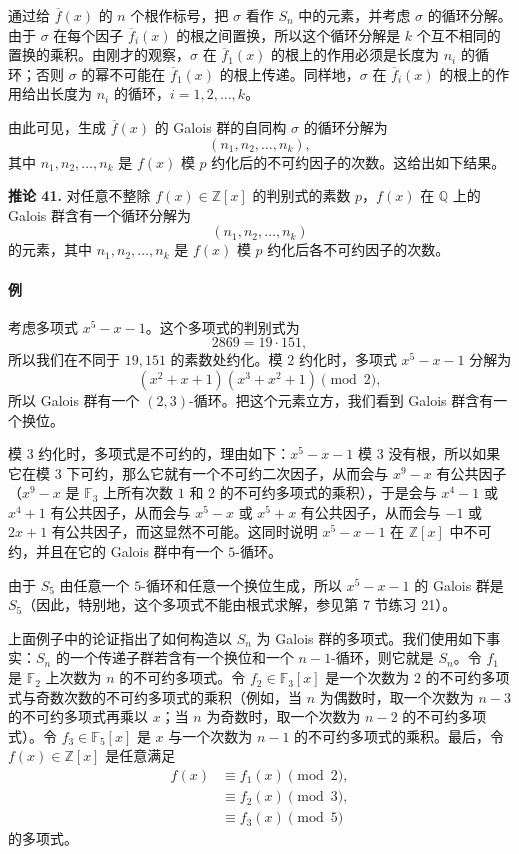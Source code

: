 通过给 $\overline f(x)$ 的 $n$ 个根作标号，把 $\sigma$ 看作 $S_n$ 中的元素，并考虑 $\sigma$ 的循环分解。由于 $\sigma$ 在每个因子 $\overline f_i(x)$ 的根之间置换，所以这个循环分解是 $k$ 个互不相同的置换的乘积。由刚才的观察，$\sigma$ 在 $\overline f_1(x)$ 的根上的作用必须是长度为 $n_i$ 的循环；否则 $\sigma$ 的幂不可能在 $\overline f_1(x)$ 的根上传递。同样地，$\sigma$ 在 $\overline f_i(x)$ 的根上的作用给出长度为 $n_i$ 的循环，$i=1,2,\ldots,k$。

由此可见，生成 $\overline f(x)$ 的 Galois 群的自同构 $\sigma$ 的循环分解为
\[
(n_1,n_2,\ldots,n_k),
\]
其中 $n_1,n_2,\ldots,n_k$ 是 $f(x)$ 模 $p$ 约化后的不可约因子的次数。这给出如下结果。

\noindent\textbf{推论 41.} 对任意不整除 $f(x)\in\mathbb Z[x]$ 的判别式的素数 $p$，$f(x)$ 在 $\mathbb Q$ 上的 Galois 群含有一个循环分解为
\[
(n_1,n_2,\ldots,n_k)
\]
的元素，其中 $n_1,n_2,\ldots,n_k$ 是 $f(x)$ 模 $p$ 约化后各不可约因子的次数。

\paragraph{例}
考虑多项式 $x^5-x-1$。这个多项式的判别式为
\[
2869=19\cdot151,
\]
所以我们在不同于 $19,151$ 的素数处约化。模 $2$ 约化时，多项式 $x^5-x-1$ 分解为
\[
(x^2+x+1)(x^3+x^2+1)\pmod 2,
\]
所以 Galois 群有一个 $(2,3)$-循环。把这个元素立方，我们看到 Galois 群含有一个换位。

模 $3$ 约化时，多项式是不可约的，理由如下：$x^5-x-1$ 模 $3$ 没有根，所以如果它在模 $3$ 下可约，那么它就有一个不可约二次因子，从而会与 $x^9-x$ 有公共因子（$x^9-x$ 是 $\mathbb F_3$ 上所有次数 $1$ 和 $2$ 的不可约多项式的乘积），于是会与 $x^4-1$ 或 $x^4+1$ 有公共因子，从而会与 $x^5-x$ 或 $x^5+x$ 有公共因子，从而会与 $-1$ 或 $2x+1$ 有公共因子，而这显然不可能。这同时说明 $x^5-x-1$ 在 $\mathbb Z[x]$ 中不可约，并且在它的 Galois 群中有一个 $5$-循环。

由于 $S_5$ 由任意一个 $5$-循环和任意一个换位生成，所以 $x^5-x-1$ 的 Galois 群是 $S_5$（因此，特别地，这个多项式不能由根式求解，参见第 7 节练习 21）。

上面例子中的论证指出了如何构造以 $S_n$ 为 Galois 群的多项式。我们使用如下事实：$S_n$ 的一个传递子群若含有一个换位和一个 $n-1$-循环，则它就是 $S_n$。令 $f_1$ 是 $\mathbb F_2$ 上次数为 $n$ 的不可约多项式。令 $f_2\in\mathbb F_3[x]$ 是一个次数为 $2$ 的不可约多项式与奇数次数的不可约多项式的乘积（例如，当 $n$ 为偶数时，取一个次数为 $n-3$ 的不可约多项式再乘以 $x$；当 $n$ 为奇数时，取一个次数为 $n-2$ 的不可约多项式）。令 $f_3\in\mathbb F_5[x]$ 是 $x$ 与一个次数为 $n-1$ 的不可约多项式的乘积。最后，令 $f(x)\in\mathbb Z[x]$ 是任意满足
\[
\begin{aligned}
f(x)&\equiv f_1(x)\pmod 2,\\
&\equiv f_2(x)\pmod 3,\\
&\equiv f_3(x)\pmod 5
\end{aligned}
\]
的多项式。

